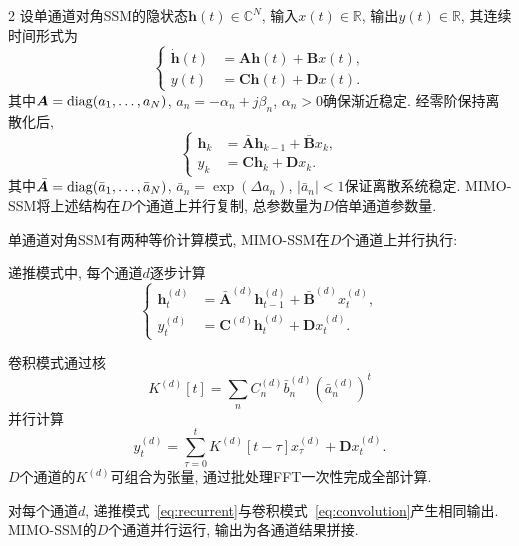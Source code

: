 \begin{multicols}{2}
设单通道对角SSM的隐状态${\bm h}(t) \in \mathbb{C}^N$,
输入$x(t) \in \mathbb{R}$, 输出$y(t) \in \mathbb{R}$, 其连续时间形式为
\begin{equation}
\left\{\begin{aligned}
\dot{{\bm h}}(t) &= {\bm A}{\bm h}(t) + {\bm B}x(t), \\
y(t) &= {\bm C}{\bm h}(t) + {\bm D}x(t).
\end{aligned}\right.
\end{equation}
其中${\bm A} = {\rm diag}(a_1, \ldots, a_N)$,
$a_n = -\alpha_n + j\beta_n$, $\alpha_n > 0$确保渐近稳定.
经零阶保持离散化后,
\begin{equation}
\left\{\begin{aligned}
{\bm h}_k &= \bar{{\bm A}}{\bm h}_{k-1} + \bar{{\bm B}}x_k, \\
y_k &= {\bm C}{\bm h}_k + {\bm D}x_k.
\end{aligned}\right.
\end{equation}
其中$\bar{{\bm A}} = {\rm diag}(\bar{a}_1, \ldots, \bar{a}_N)$,
$\bar{a}_n = \exp(\Delta a_n)$, $|\bar{a}_n| < 1$保证离散系统稳定.
MIMO-SSM将上述结构在$D$个通道上并行复制, 总参数量为$D$倍单通道参数量.

\begin{Def}
\label{def:ssm_modes}
单通道对角SSM有两种等价计算模式, MIMO-SSM在$D$个通道上并行执行:

递推模式中, 每个通道$d$逐步计算
\begin{equation}
\label{eq:recurrent}
\left\{\begin{aligned}
{\bm h}_t^{(d)} &= \bar{{\bm A}}^{(d)}{\bm h}_{t-1}^{(d)} + \bar{{\bm B}}^{(d)}x_t^{(d)}, \\
y_t^{(d)} &= {\bm C}^{(d)}{\bm h}_t^{(d)} + {\bm D}x_t^{(d)}.
\end{aligned}\right.
\end{equation}

卷积模式通过核
\begin{equation}
K^{(d)}[t] = \sum_n C_n^{(d)}\bar{b}_n^{(d)}(\bar{a}_n^{(d)})^t
\end{equation}
并行计算
\begin{equation}
\label{eq:convolution}
y_t^{(d)} = \sum_{\tau=0}^{t} K^{(d)}[t{-}\tau] x_\tau^{(d)} + {\bm D}x_t^{(d)}.
\end{equation}
$D$个通道的$K^{(d)}$可组合为张量, 通过批处理FFT一次性完成全部计算.
\end{Def}

\begin{Thm}
\label{thm:equiv}
对每个通道$d$, 递推模式~\eqref{eq:recurrent}与卷积模式~\eqref{eq:convolution}产生相同输出.
MIMO-SSM的$D$个通道并行运行, 输出为各通道结果拼接.
\end{Thm}


\end{multicols}
